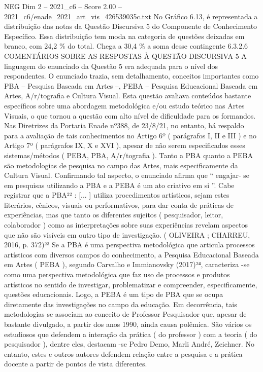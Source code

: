 \begin{textsample}{NEG Dim 2 – 2021\_c6 – Score 2.00 – 2021\_c6/enade\_2021\_art\_vis\_426539035c.txt}
No Gráfico 6.13, é representada a distribuição das notas da Questão Discursiva 5 do Componente de Conhecimento Específico.
Essa distribuição tem moda na categoria de questões deixadas em branco, com 24,2 \% do total.
Chega a 30,4 \% a soma desse contingente 6.3.2.6 COMENTÁRIOS SOBRE AS RESPOSTAS À QUESTÃO DISCURSIVA 5 A linguagem do enunciado da Questão 5 era adequada para o nível dos respondentes.
O enunciado trazia, sem detalhamento, conceitos importantes como PBA – Pesquisa Baseada em Artes –, PEBA – Pesquisa Educacional Baseada em Artes, A/r/tografia e Cultura Visual.
Esta questão avaliava conteúdos bastante específicos sobre uma abordagem metodológica e/ou estudo teórico nas Artes Visuais, o que tornou a questão com alto nível de dificuldade para os formandos.
Nas Diretrizes da Portaria Enade nº388, de 23/8/21, no entanto, há respaldo para a avaliação de tais conhecimentos no Artigo 6º ( parágrafos I, II e III ) e no Artigo 7º ( parágrafos IX, X e XVI ), apesar de não serem especificados esses sistemas/métodos ( PEBA, PBA, A/r/tografia ).
Tanto a PBA quanto a PEBA são metodologias de pesquisa no campo das Artes, mais especificamente da Cultura Visual.
Confirmando tal aspecto, o enunciado afirma que “ engajar- se em pesquisas utilizando a PBA e a PEBA é um ato criativo em si ”.
Cabe registrar que a PBA²² : [... ] utiliza procedimentos artísticos, sejam estes literários, cênicos, visuais ou performativos, para dar conta de práticas de experiências, mas que tanto os diferentes sujeitos ( pesquisador, leitor, colaborador ) como as interpretações sobre suas experiências revelam aspectos que não são visíveis em outro tipo de investigação. ( OLIVEIRA ; CHARREU, 2016, p. 372)²³ Se a PBA é uma perspectiva metodológica que articula processos artísticos com diversos campos do conhecimento, a Pesquisa Educacional Baseada em Artes ( PEBA ), segundo Carvalho e Immianovsky (2017)²⁴, caracteriza -se como uma perspectiva metodológica que faz uso de processos e produtos artísticos no sentido de investigar, problematizar e compreender, especificamente, questões educacionais.
Logo, a PEBA é um tipo de PBA que se ocupa diretamente das investigações no campo da educação.
Em decorrência, tais metodologias se associam ao conceito de Professor Pesquisador que, apesar de bastante divulgado, a partir dos anos 1990, ainda causa polêmica.
São vários os estudiosos que defendem a interação da prática ( do professor ) com a teoria ( do pesquisador ), dentre eles, destacam -se Pedro Demo, Marli André, Zeichner.
No entanto, estes e outros autores defendem relação entre a pesquisa e a prática docente a partir de pontos de vista diferentes.

\end{textsample}
